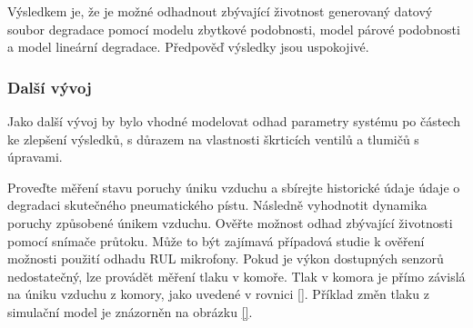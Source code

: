 Výsledkem je, že je možné odhadnout zbývající životnost
generovaný datový soubor degradace pomocí modelu zbytkové podobnosti,
model párové podobnosti a model lineární degradace. Předpověď
výsledky jsou uspokojivé.

\subsubsection*{Další vývoj}

Jako další vývoj by bylo vhodné modelovat odhad
parametry systému po částech ke zlepšení výsledků, s důrazem na
vlastnosti škrticích ventilů a tlumičů s úpravami.

Proveďte měření stavu poruchy úniku vzduchu a sbírejte historické údaje
údaje o degradaci skutečného pneumatického pístu. Následně vyhodnotit
dynamika poruchy způsobené únikem vzduchu. Ověřte možnost
odhad zbývající životnosti pomocí snímače průtoku. Může to být
zajímavá případová studie k ověření možnosti použití odhadu RUL
mikrofony. Pokud je výkon dostupných senzorů nedostatečný,
lze provádět měření tlaku v komoře. Tlak v
komora je přímo závislá na úniku vzduchu z komory, jako
uvedené v rovnici \ref{}. Příklad změn tlaku z
simulační model je znázorněn na obrázku \ref{}.
